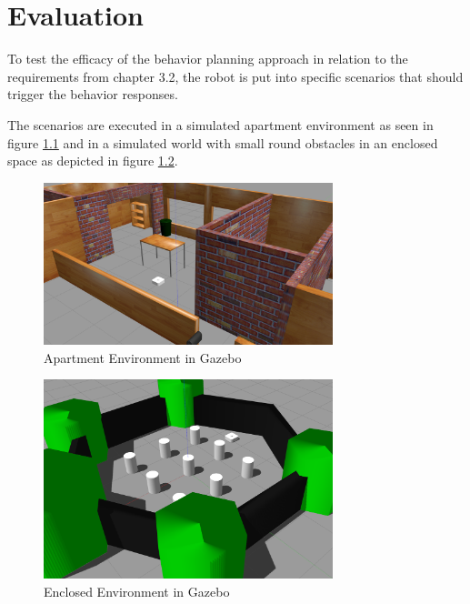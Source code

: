 \chapter{Evaluation}
\label{cha:ergebnisse}

To test the efficacy of the behavior planning approach in relation to the requirements from chapter 3.2, the robot is put into specific scenarios that should trigger the behavior responses. 

The scenarios are executed in a simulated apartment environment as seen in figure \ref{fig:house_gazebo} and in a simulated world with small round obstacles in an enclosed space as depicted in figure \ref{fig:world_gazebo}. 
\begin{center}
\begin{figure}[ht]
	\label{fig:house_gazebo}
	\includegraphics[width=0.75\textwidth]{images/house_env.png}
	\caption{Apartment Environment in Gazebo}
\end{figure}
\end{center}

\begin{center}
\begin{figure}
	\label{fig:world_gazebo}
	\includegraphics[width=0.75\textwidth]{images/world_env.png}
	\caption{Enclosed Environment in Gazebo}
\end{figure}
\end{center}

